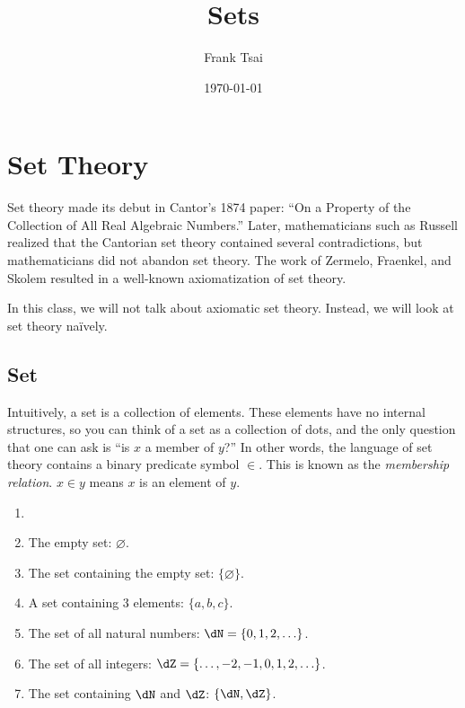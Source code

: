 \documentclass{amsart}
\title{Sets}
\author{Frank Tsai}
\date{\today}
\begin{document}
\maketitle
\tableofcontents

\section{Set Theory}
\label{sec:basic-set-theory}

Set theory made its debut in Cantor's 1874 paper: ``On a Property of the Collection of All Real Algebraic Numbers.''
Later, mathematicians such as Russell realized that the Cantorian set theory contained several contradictions, but mathematicians did not abandon set theory.
The work of Zermelo, Fraenkel, and Skolem resulted in a well-known axiomatization of set theory.

In this class, we will not talk about axiomatic set theory.
Instead, we will look at set theory na\"ively.

\subsection{Set}
\label{sec:set}

Intuitively, a set is a collection of elements.
These elements have no internal structures, so you can think of a set as a collection of dots, and the only question that one can ask is ``is $x$ a member of $y$?''
In other words, the language of set theory contains a binary predicate symbol $\in$.
This is known as the \emph{membership relation}.
$x \in y$ means $x$ is an element of $y$.

\begin{eg}
  \begin{enumerate}
  \item[]
  \item The empty set: $\varnothing$.
  \item The set containing the empty set: $\{\varnothing\}$.
  \item A set containing 3 elements: $\{ a,b,c \}$.
  \item The set of all natural numbers: $\dN = \{ 0,1,2,\ldots \}$.
  \item The set of all integers: $\dZ = \{ \ldots,-2,-1,0,1,2,\ldots \}$.
  \item The set containing $\dN$ and $\dZ$: $\{ \dN,\dZ \}$.
  \end{enumerate}
\end{eg}
\end{document}
